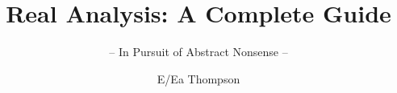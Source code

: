 \documentclass[graybox,envcountchap,sectrefs]{style/svmono}
\begin{document}
\author{E/Ea Thompson}
\title{Real Analysis: A Complete Guide}
\subtitle{-- In Pursuit of Abstract Nonsense --}
\maketitle

\frontmatter%

%
%

%

\tableofcontents

%


\mainmatter%




































%

\backmatter%
%
%
\printindex

\end{document}

